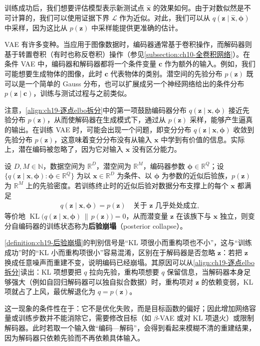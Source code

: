 \documentclass[../../main.tex]{subfiles}
\begin{document}
训练成功后，我们想要评估模型表示新测试点 $\hat{\bm{x}}$ 的效果如何。由于对数似然是不可计算的，我们可以使用证据下界 $\mathcal{L}$ 作为近似。对此，我们可以从 $q(\bm{z}\mid\hat{\bm{x}},\bm{\phi})$ 中采样，因为这比从 $p(\bm{z})$ 中采样能提供更准确的估计。

VAE 有许多变种。当应用于图像数据时，编码器通常基于卷积操作，而解码器则基于转置卷积（有时也称反卷积）操作（参见\cref{subsection:ch10-全卷积网络}）。在条件 VAE 中，编码器和解码器都将一个条件变量 $\bm{c}$ 作为额外的输入。例如，我们可能想要生成物体的图像，此时 $\bm{c}$ 代表物体的类别。潜空间的先验分布 $p(\bm{z})$ 既可以是一个简单的 Gauss 分布，也可以扩展成另一个神经网络给出的条件分布 $p(\bm{z}\mid\bm{c})$，训练与测试过程与之前类似。

注意，\eqref{align:ch19-逐点elbo拆分}中的第一项鼓励编码器分布 $q(\bm{z}\mid\bm{x},\bm{\phi})$ 接近先验分布 $p(\bm{z})$，从而使解码器在生成模式下，通过从 $p(\bm{z})$ 采样，能够产生逼真的输出。在训练 VAE 时，可能会出现一个问题，即变分分布 $q(\bm{z}\mid\bm{x},\bm{\phi})$ 收敛到先验分布 $p(\bm{z})$，这意味着变分分布没有从输入 $\bm{x}$ 中学到有价值的信息。实际上，潜在编码被忽略了，因为它对输入 $\bm{x}$ 没有区分能力。

\begin{definition}[后验崩塌]\label{definition:ch19-后验崩塌}
设 $D,M\in\mathbb{N}$，数据空间为 $\mathbb{R}^{D}$，潜空间为 $\mathbb{R}^{M}$，编码器参数 $\bm{\phi}\in\mathbb{R}^{Q}$；设 $\{q(\bm{z}\mid\bm{x},\bm{\phi}):\bm{\phi}\in\mathbb{R}^{Q}\}$ 为以 $\bm{x}\in\mathbb{R}^{D}$ 为条件、以 $\bm{\phi}$ 为参数的近似后验族，$p(\bm{z})$ 为 $\mathbb{R}^{M}$ 上的先验密度。若训练终止时的近似后验对数据分布支撑上的每个 $\bm{x}$ 都满足
\begin{align*}
q(\bm{z}\mid\bm{x},\bm{\phi})=p(\bm{z})\quad\text{关于 }\bm{z}\text{ 几乎处处成立},
\end{align*}
等价地 $\operatorname{KL}\big(q(\bm{z}\mid\bm{x},\bm{\phi})\,\|\,p(\bm{z})\big)=0$，从而潜变量 $\bm{z}$ 在该族下与 $\bm{x}$ 独立，则变分自编码器的训练状态称为\textbf{后验崩塌}（posterior collapse）。
\end{definition}

\begin{remark}
\cref{definition:ch19-后验崩塌}的判别信号是“KL 项很小而重构项也不小”，这与“训练成功”时的“KL 小而重构项很小”容易混淆，区别在于解码器是否忽略 $\bm{z}$：若把 $\bm{z}$ 换成任意噪声而重建不变，说明编码已经崩塌。其原因可以从\eqref{align:ch19-逐点elbo拆分}读出：KL 项想要把 $q$ 拉向先验，重构项想要 $q$ 保留信息，当解码器本身足够强大（例如自回归解码器可以独自拟合数据）时，重构项对 $\bm{z}$ 的依赖变弱，KL 项就占了上风，最优解退化为 $q=p(\bm{z})$。

这一现象的条件性在于：它不是优化失败，而是目标函数的偏好；因此增加网络容量或训练步数并不能消除它，需要修改目标（如 $\beta$-VAE 或对 KL 项退火）或限制解码器。此时若取一个输入做“编码—解码”，会得到看起来模糊不清的重建结果，因为解码器只依赖先验而不再依赖具体输入。
\end{remark}
\end{document}
